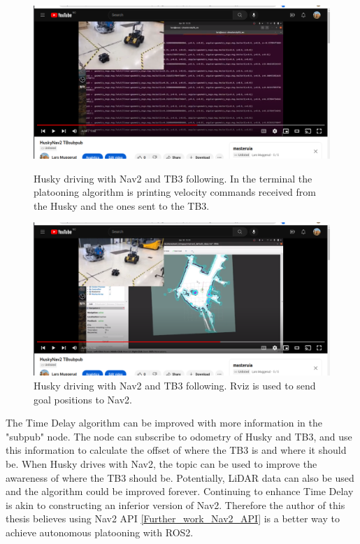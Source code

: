 \begin{figure}[H]
  \centering
  \begin{minipage}[b]{0.5\textwidth}
    \includegraphics[width=\textwidth]{Figures/YouTube/HuksyNav2 TBsubpub.png}
    \caption{Husky driving with Nav2 and TB3 following. In the terminal the platooning algorithm is printing velocity commands received from the Husky and the ones sent to the TB3.}
    \label{fig:TB w Nav2 1.png}
  \end{minipage}
  \hfill
  \begin{minipage}[b]{0.49\textwidth}
    \includegraphics[width=\textwidth]{Figures/YouTube/HuskyNav2 TBsubpub2.png}
    \caption{Husky driving with Nav2 and TB3 following. Rviz is used to send goal positions to Nav2.}
    \label{fig:TB w Nav2 2}
  \end{minipage}
\end{figure}

    
The Time Delay algorithm can be improved with more information in the "subpub" node. The node can subscribe to odometry of Husky and TB3, and use this information to calculate the offset of where the TB3 is and where it should be. When Husky drives with Nav2, the topic  can be used to improve the awareness of where the TB3 should be. Potentially, LiDAR data can also be used and the algorithm could be improved forever. Continuing to enhance Time Delay is akin to constructing an inferior version of Nav2. Therefore the author of this thesis believes using Nav2 API \ref{Further_work_Nav2_API} is a better way to achieve autonomous platooning with ROS2. 


